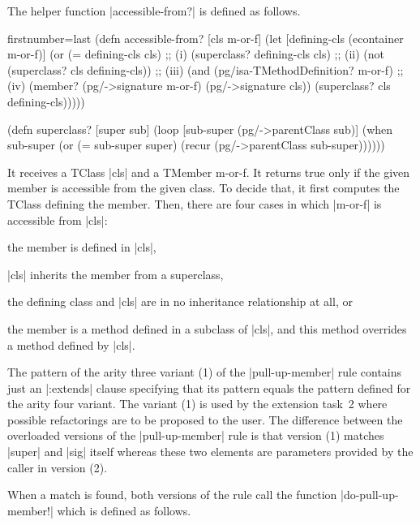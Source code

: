 \documentclass[submission]{eptcs}
\newcommand{\code}{\clojureinline}
\begin{document}
The helper function \code|accessible-from?| is defined as follows.

\begin{clojurecode*}{firstnumber=last}
(defn accessible-from? [cls m-or-f]
  (let [defining-cls (econtainer m-or-f)]
    (or (= defining-cls cls)                    ;; (i)
        (superclass? defining-cls cls)          ;; (ii)
        (not (superclass? cls defining-cls))    ;; (iii)
        (and (pg/isa-TMethodDefinition? m-or-f) ;; (iv)
             (member? (pg/->signature m-or-f)
                      (pg/->signature cls))
             (superclass? cls defining-cls)))))

(defn superclass? [super sub]
  (loop [sub-super (pg/->parentClass sub)]
    (when sub-super
      (or (= sub-super super)
          (recur (pg/->parentClass sub-super))))))
\end{clojurecode*}

It receives a \textsf{TClass} \code|cls| and a \textsf{TMember}
\textsf{m-or-f}.  It returns true only if the given member is accessible from
the given class.  To decide that, it first computes the \textsf{TClass}
defining the member.  Then, there are four cases in which \code|m-or-f| is
accessible from \code|cls|:
\begin{inparaenum}[(i)]
\item the member is defined in \code|cls|,
\item \code|cls| inherits the member from a superclass,
\item the defining class and \code|cls| are in no inheritance relationship at
  all, or
\item the member is a method defined in a subclass of \code|cls|, and this
  method overrides a method defined by \code|cls|.
\end{inparaenum}

The pattern of the arity three variant (1) of the \code|pull-up-member| rule
contains just an \code|:extends| clause specifying that its pattern equals the
pattern defined for the arity four variant.  The variant (1) is used by the
extension task~2 where possible refactorings are to be proposed to the user.
The difference between the overloaded versions of the \code|pull-up-member|
rule is that version (1) matches \code|super| and \code|sig| itself whereas
these two elements are parameters provided by the caller in version (2).

When a match is found, both versions of the rule call the function
\code|do-pull-up-member!| which is defined as follows.
\end{document}
